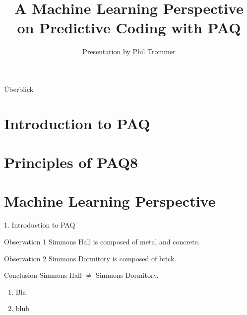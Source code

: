 \documentclass[11pt,usenames,dvipsnames]{beamer}
\author{Presentation by Phil Trommer}
\title{A Machine Learning Perspective on Predictive Coding with PAQ}
\begin{document}
\begin{frame}
\titlepage
\end{frame}

\begin{frame}{Überblick}
\tableofcontents
\end{frame}


\section{Introduction to PAQ}
\section{Principles of PAQ8}
\section{Machine Learning Perspective}



\begin{frame}{1. Introduction to PAQ}
\end{frame}

\begin{frame}{}
\begin{block}{Observation 1}
Simmons Hall is composed of metal and concrete.
\end{block}
\begin{exampleblock}{Observation 2}
Simmons Dormitory is composed of brick.
\end{exampleblock}
\begin{alertblock}{Conclusion}
Simmons Hall $\not=$ Simmons Dormitory.
\begin{enumerate}
	\item Bla
	\item blub

\end{enumerate}

\end{alertblock}
\end{frame}
\end{document}
